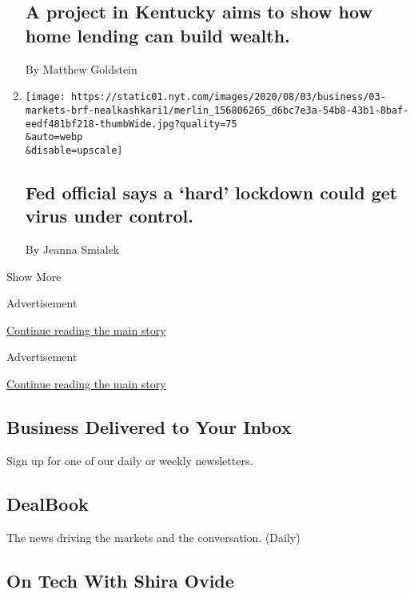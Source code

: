 \begin{enumerate}
{  \subsection{A project in Kentucky aims to show how home lending can
  build
  wealth.}\label{a-project-in-kentucky-aims-to-show-how-home-lending-can-build-wealth}}

  By Matthew Goldstein
\item
  \href{/2020/08/03/business/fed-official-says-a-hard-lockdown-could-get-virus-under-control.html}{}

  \texttt{[image: https://static01.nyt.com/images/2020/08/03/business/03-markets-brf-nealkashkari1/merlin\_156806265\_d6bc7e3a-54b8-43b1-8baf-eedf481bf218-thumbWide.jpg?quality=75\\\&auto=webp\\\&disable=upscale]}

  \hypertarget{fed-official-says-a-hard-lockdown-could-get-virus-under-control}{%
  \subsection{Fed official says a `hard' lockdown could get virus under
  control.}\label{fed-official-says-a-hard-lockdown-could-get-virus-under-control}}

  By Jeanna Smialek
\end{enumerate}

Show More

Advertisement

\protect\hyperlink{after-mid2}{Continue reading the main story}

Advertisement

\protect\hyperlink{after-mktg}{Continue reading the main story}

\hypertarget{business-delivered-to-your-inbox}{%
\subsection{Business Delivered to Your
Inbox}\label{business-delivered-to-your-inbox}}

Sign up for one of our daily or weekly newsletters.

\hypertarget{dealbook}{%
\subsection{DealBook}\label{dealbook}}

The news driving the markets and the conversation. (Daily)

\hypertarget{on-tech-with-shira-ovide}{%
\subsection{On Tech With Shira Ovide}\label{on-tech-with-shira-ovide}}

